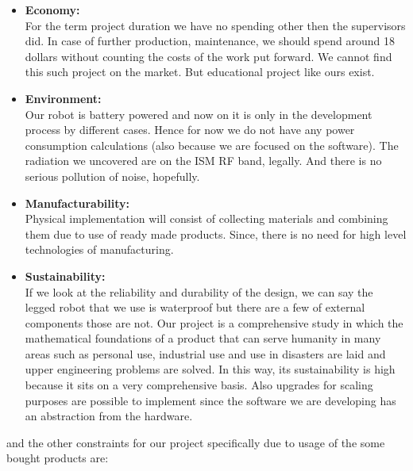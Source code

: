 \documentclass[12pt]{article}
\begin{document}
\begin{itemize}
    \item \textbf{Economy:} \\
          For the term project duration we have no spending other then the supervisors did. In case of further production, maintenance, we should spend around 18 dollars without counting the costs of the work put forward. We cannot find this such project on the market. But educational project like ours exist.
          
    \item \textbf{Environment:} \\
          Our robot is battery powered and now on it is only in the development process by different cases. Hence for now we do not have any power consumption calculations (also because we are focused on the software). The radiation we uncovered are on the ISM RF band, legally. And there is no serious pollution of noise, hopefully.
          
    \item \textbf{Manufacturability:} \\
          Physical implementation will consist of collecting materials and combining them due to use of ready made products. Since, there is no need for high level technologies of manufacturing.
          
    \item \textbf{Sustainability:} \\
          If we look at the reliability and durability of the design, we can say the legged robot that we use is waterproof but there are a few of external components those are not. Our project is a comprehensive study in which the mathematical foundations of a product that can serve humanity in many areas such as personal use, industrial use and use in disasters are laid and upper engineering problems are solved. In this way, its sustainability is high because it sits on a very comprehensive basis. Also upgrades for scaling purposes are possible to implement since the software we are developing has an abstraction from the hardware. 
          
\end{itemize}

and the other constraints for our project specifically due to usage of the some bought products are:
\end{document}
